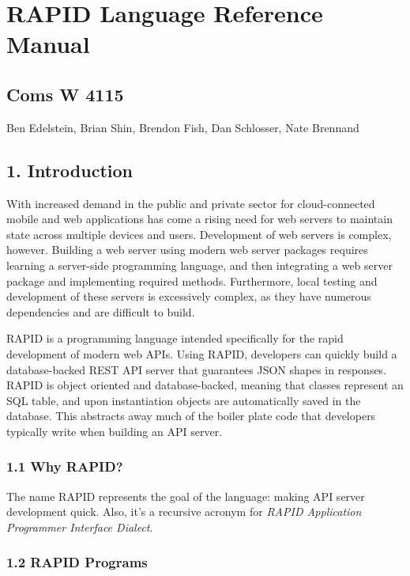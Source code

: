 \documentclass[]{article}
\date{}
\begin{document}
\section{RAPID Language Reference
Manual}\label{rapid-language-reference-manual}

\subsection{Coms W 4115}\label{coms-w-4115}

Ben Edelstein, Brian Shin, Brendon Fish, Dan Schlosser, Nate Brennand

\subsection{1. Introduction}\label{introduction}

With increased demand in the public and private sector for
cloud-connected mobile and web applications has come a rising need for
web servers to maintain state across multiple devices and users.
Development of web servers is complex, however. Building a web server
using modern web server packages requires learning a server-side
programming language, and then integrating a web server package and
implementing required methods. Furthermore, local testing and
development of these servers is excessively complex, as they have
numerous dependencies and are difficult to build.

RAPID is a programming language intended specifically for the rapid
development of modern web APIs. Using RAPID, developers can quickly
build a database-backed REST API server that guarantees JSON shapes in
responses. RAPID is object oriented and database-backed, meaning that
classes represent an SQL table, and upon instantiation objects are
automatically saved in the database. This abstracts away much of the
boiler plate code that developers typically write when building an API
server.

\subsubsection{1.1 Why RAPID?}\label{why-rapid}

The name RAPID represents the goal of the language: making API server
development quick. Also, it's a recursive acronym for \emph{RAPID
Application Programmer Interface Dialect}.

\subsubsection{1.2 RAPID Programs}\label{rapid-programs}
\end{document}

